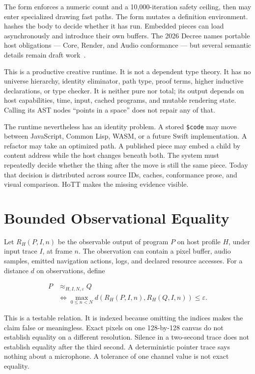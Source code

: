 \documentclass[10pt,letterpaper,twocolumn]{article}
\newcommand{\code}[1]{\texttt{\detokenize{#1}}}
\begin{document}
The \code{repeat} form enforces a numeric count and a 10,000-iteration safety ceiling, then may enter specialized drawing fast paths. The \code{def} form mutates a definition environment. \code{once} hashes the body to decide whether it has run. Embedded pieces can load asynchronously and introduce their own buffers. The 2026 Decree names portable host obligations --- Core, Render, and Audio conformance --- but several semantic details remain draft work~\citep{scudder2026decree}.

This is a productive creative runtime. It is not a dependent type theory. It has no universe hierarchy, identity eliminator, path type, proof terms, higher inductive declarations, or type checker. It is neither pure nor total; its output depends on host capabilities, time, input, cached programs, and mutable rendering state. Calling its AST nodes ``points in a space'' does not repair any of that.

The runtime nevertheless has an identity problem. A stored \texttt{\$code} may move between JavaScript, Common Lisp, WASM, or a future Swift implementation. A refactor may take an optimized path. A published piece may embed a child by content address while the host changes beneath both. The system must repeatedly decide whether the thing after the move is still the same piece. Today that decision is distributed across source IDs, caches, conformance prose, and visual comparison. HoTT makes the missing evidence visible.

\section{Bounded Observational Equality}
\label{sec:relation}

Let $R_H(P,I,n)$ be the observable output of program $P$ on host profile $H$, under input trace $I$, at frame $n$. The observation can contain a pixel buffer, audio samples, emitted navigation actions, logs, and declared resource accesses. For a distance $d$ on observations, define

\begin{align*}
 P &\approx_{H,I,N,\varepsilon} Q \\
 &\Longleftrightarrow
 \max_{0\leq n<N} d\!\left(R_H(P,I,n),R_H(Q,I,n)\right)\leq\varepsilon.
\end{align*}

This is a testable relation. It is indexed because omitting the indices makes the claim false or meaningless. Exact pixels on one 128-by-128 canvas do not establish equality on a different resolution. Silence in a two-second trace does not establish equality after the third second. A deterministic pointer trace says nothing about a microphone. A tolerance of one channel value is not exact equality.
\end{document}
